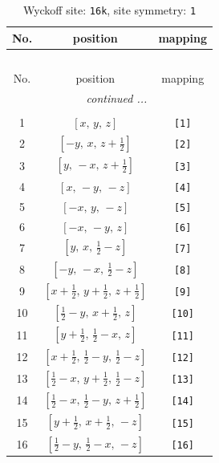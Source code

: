 \documentclass[fleqn,8pt]{jsarticle}
\begin{document}
\begin{longtable}{ccc}
\caption{Wyckoff site: {\tt 16k}, site symmetry: {\tt 1}}
 \\
 \hline \hline
No. & position & mapping \\ \hline \endfirsthead

\multicolumn{2}{l}{\tablename\ \thetable{}} \\
 \hline \hline
No. & position & mapping \\ \hline \endhead

 \hline \hline
\multicolumn{2}{r}{\footnotesize\it continued ...} \\ \endfoot

 \hline \hline
\multicolumn{2}{r}{} \\ \endlastfoot

1 & $\left[ x,\, y,\, z \right]$ & {\tt [1]} \\ \hline
2 & $\left[ - y,\, x,\, z + \frac{1}{2} \right]$ & {\tt [2]} \\ \hline
3 & $\left[ y,\, - x,\, z + \frac{1}{2} \right]$ & {\tt [3]} \\ \hline
4 & $\left[ x,\, - y,\, - z \right]$ & {\tt [4]} \\ \hline
5 & $\left[ - x,\, y,\, - z \right]$ & {\tt [5]} \\ \hline
6 & $\left[ - x,\, - y,\, z \right]$ & {\tt [6]} \\ \hline
7 & $\left[ y,\, x,\, \frac{1}{2} - z \right]$ & {\tt [7]} \\ \hline
8 & $\left[ - y,\, - x,\, \frac{1}{2} - z \right]$ & {\tt [8]} \\ \hline
9 & $\left[ x + \frac{1}{2},\, y + \frac{1}{2},\, z + \frac{1}{2} \right]$ & {\tt [9]} \\ \hline
10 & $\left[ \frac{1}{2} - y,\, x + \frac{1}{2},\, z \right]$ & {\tt [10]} \\ \hline
11 & $\left[ y + \frac{1}{2},\, \frac{1}{2} - x,\, z \right]$ & {\tt [11]} \\ \hline
12 & $\left[ x + \frac{1}{2},\, \frac{1}{2} - y,\, \frac{1}{2} - z \right]$ & {\tt [12]} \\ \hline
13 & $\left[ \frac{1}{2} - x,\, y + \frac{1}{2},\, \frac{1}{2} - z \right]$ & {\tt [13]} \\ \hline
14 & $\left[ \frac{1}{2} - x,\, \frac{1}{2} - y,\, z + \frac{1}{2} \right]$ & {\tt [14]} \\ \hline
15 & $\left[ y + \frac{1}{2},\, x + \frac{1}{2},\, - z \right]$ & {\tt [15]} \\ \hline
16 & $\left[ \frac{1}{2} - y,\, \frac{1}{2} - x,\, - z \right]$ & {\tt [16]} \\
\end{longtable}
\end{document}
